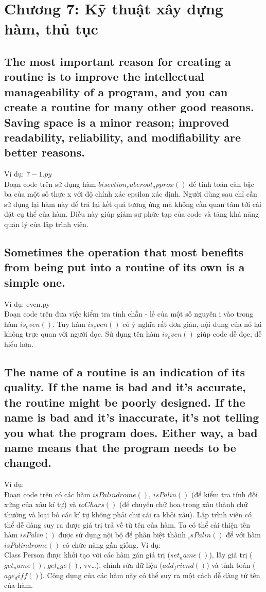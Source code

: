 \documentclass{article}
\begin{document}
\section{Chương 7: Kỹ thuật xây dựng hàm, thủ tục }
    \subsection{The most important reason for creating a routine is to improve the intellectual manageability of a program, and you can create a routine for many other good reasons. Saving space is a minor reason; improved readability, reliability, and modifiability are better reasons.}
    Ví dụ: $7-1.py$\\
    Đoạn code trên sử dụng hàm $bisection_cuberoot_approx()$ để tính toán căn bậc ba của một số thực x với độ chính xác epsilon xác định. Người dùng sau chỉ cần sử dụng lại hàm này để trả lại kết quả tương ứng mà không cần quan tâm tới cài đặt cụ thể của hàm. Điều này giúp giảm sự phức tạp của code và tăng khả năng quản lý của lập trình viên.
    
    \subsection{Sometimes the operation that most benefits from being put into a routine of its own is a simple one.}
    Ví dụ: even.py\\
    Đoạn code trên đưa việc kiểm tra tính chẵn - lẻ của một số nguyên i vào trong hàm $is_even()$. Tuy hàm $is_even()$ có ý nghĩa rất đơn giản, nội dung của nó lại không trực quan với người đọc. Sử dụng tên hàm $is_even()$ giúp code dễ đọc, dễ hiểu hơn.
    
    \subsection{The name of a routine is an indication of its quality. If the name is bad and it's accurate, the routine might be poorly designed. If the name is bad and it's inaccurate, it's not telling you what the program does. Either way, a bad name means that the program needs to be changed.}
    Ví dụ: \\
    Đoạn code trên có các hàm $isPalindrome()$, $isPalin()$ (để kiểm tra tính đối xứng của xâu kí tự) và $toChars()$ (để chuyển chữ hoa trong xâu thành chữ thường và loại bỏ các kí tự không phải chữ cái ra khỏi xâu). Lập trình viên có thể dễ dàng suy ra được giá trị trả về từ tên của hàm. Ta có thể cải thiện tên hàm $isPalin()$ được sử dụng nội bộ để phân biệt thành $_isPalin()$ để với hàm $isPalindrome()$ có chức năng gần giống.
    Ví dụ: \\
    Class Person được khởi tạo với các hàm gán giá trị ($set_name()$), lấy giá trị ($get_name()$, $get_age()$, vv…), chỉnh sửa dữ liệu ($add_friend()$) và tính toán ($age_diff()$). Công dụng của các hàm này có thể suy ra một cách dễ dàng từ tên của hàm.\\
    
\end{document}
